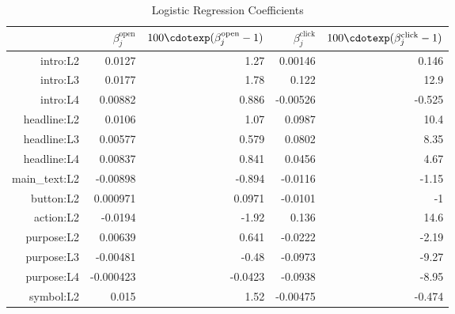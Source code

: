 \begin{table}[ht]
\centering
\caption{Logistic Regression Coefficients} 
\label{tab:logit_results}
\begin{tabular}{rrrrr}
  \hline
 & $\beta_j^{\text{open}}$ & $100\cdotexp(\beta_j^{\text{open}}-1)$ & $\beta_j^{\text{click}}$ & $100\cdotexp(\beta_j^{\text{click}}-1)$ \\ 
  \hline
\textsf{intro:L2} & 0.0127 & 1.27 & 0.00146 & 0.146 \\ 
  \textsf{intro:L3} & 0.0177 & 1.78 & 0.122 & 12.9 \\ 
  \textsf{intro:L4} & 0.00882 & 0.886 & -0.00526 & -0.525 \\ 
  \textsf{headline:L2} & 0.0106 & 1.07 & 0.0987 & 10.4 \\ 
  \textsf{headline:L3} & 0.00577 & 0.579 & 0.0802 & 8.35 \\ 
  \textsf{headline:L4} & 0.00837 & 0.841 & 0.0456 & 4.67 \\ 
  \textsf{main\_text:L2} & -0.00898 & -0.894 & -0.0116 & -1.15 \\ 
  \textsf{button:L2} & 0.000971 & 0.0971 & -0.0101 &   -1 \\ 
  \textsf{action:L2} & -0.0194 & -1.92 & 0.136 & 14.6 \\ 
  \textsf{purpose:L2} & 0.00639 & 0.641 & -0.0222 & -2.19 \\ 
  \textsf{purpose:L3} & -0.00481 & -0.48 & -0.0973 & -9.27 \\ 
  \textsf{purpose:L4} & -0.000423 & -0.0423 & -0.0938 & -8.95 \\ 
  \textsf{symbol:L2} & 0.015 & 1.52 & -0.00475 & -0.474 \\ 
   \hline
\end{tabular}
\end{table}
